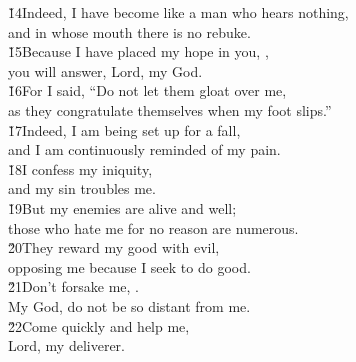 \begin{poetry}
\poeml \v{14}Indeed, I have become like a man who hears nothing, \\
\poemll    and in whose mouth there is no rebuke. \\
\poeml \v{15}Because I have placed my hope in you, , \\
\poemll    you will answer, Lord, my God. \\
\poeml \v{16}For I said, ``Do not let them gloat over me, \\
\poemll    as they congratulate themselves when my foot slips.'' \\
\poeml \v{17}Indeed, I am being set up for a fall, \\
\poemll    and I am continuously reminded of my pain. \\
\poeml \v{18}I confess my iniquity, \\
\poemll    and my sin troubles me. \\
\poeml \v{19}But my enemies are alive and well; \\
\poemll    those who hate me for no reason are numerous. \\
\poeml \v{20}They reward my good with evil, \\
\poemll    opposing me because I seek to do good. \\
\poeml \v{21}Don't forsake me, . \\
\poemll    My God, do not be so distant from me. \\
\poeml \v{22}Come quickly and help me, \\
\poemll    Lord, my deliverer.
\end{poetry}

